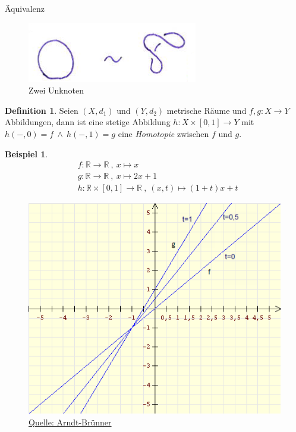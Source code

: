 \documentclass[a4paper,pagesizefontsize=12pt]{scrartcl}
\newcommand\R{\mathbb{R}}
\theoremstyle{definition}
\newtheorem{defi}{Definition}
\newtheorem*{bsp*}{Beispiel}
\theoremstyle{remark}
\begin{document}
\begin{section}{Äquivalenz}

\begin{figure}[H]
\center
\includegraphics[width=0.4\linewidth]{Aequivalenz}
\caption* {Zwei Unknoten}
\end{figure}

\begin{defi}
Seien $(X,d_1)$ und $(Y,d_2)$ metrische Räume und $f,g: X\longrightarrow Y$ Abbildungen, dann ist eine stetige Abbildung  $h: X\times [0,1]\longrightarrow Y$ mit $h(-,0)=f\  \wedge \ h(-,1)=g$ eine \textit{Homotopie} zwischen $f$ und $g$.
\end{defi}

\begin{bsp*}
\begin{align*}
&f:\R\rightarrow \R\ ,\ x\mapsto x 
\\&g:\R\rightarrow \R\ ,\ x\mapsto 2x+1
\\&h:\R\times[0,1] \rightarrow \R\ , \ (x,t)\mapsto(1+t)x+t
\end{align*}
\begin{figure}[H]
\center
\includegraphics[width=0.7\linewidth]{Homotopie}
\caption*{\href{http://www.arndt-bruenner.de/mathe/java/plotter.htm}{Quelle: Arndt-Brünner}}
\end{figure}
\end{bsp*}


\end{section}
\end{document}
